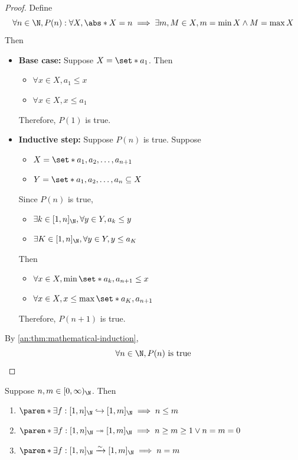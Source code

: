 \begin{proof}
  Define
  \[
    \forall n \in \N, P(n): \forall X, \abs*{X} = n \implies \exists m, M \in X, m = \min X \land M = \max X
  \]
  Then
  \begin{itemize}
    \item \textbf{Base case:} Suppose $X = \set*{a_{1}}$. Then
          \begin{itemize}
            \item $\forall x \in X, a_{1} \leq x$
            \item $\forall x \in X, x \leq a_{1}$
          \end{itemize}
          Therefore, $P(1)$ is true.
    \item \textbf{Inductive step:} Suppose $P(n)$ is true. Suppose
          \begin{itemize}
            \item $X = \set*{a_{1}, a_{2}, \dots, a_{n + 1}}$
            \item $Y = \set*{a_{1}, a_{2}, \dots, a_{n}} \subseteq X$
          \end{itemize}
          Since $P(n)$ is true,
          \begin{itemize}
            \item $\exists k \in [1, n]_{\N}, \forall y \in Y, a_{k} \leq y$
            \item $\exists K \in [1, n]_{\N}, \forall y \in Y, y \leq a_{K}$
          \end{itemize}
          Then
          \begin{itemize}
            \item $\forall x \in X, \min\set*{{a_{k}, a_{n + 1}}} \leq x$
            \item $\forall x \in X, x \leq \max\set*{{a_{K}, a_{n + 1}}}$
          \end{itemize}
          Therefore, $P(n + 1)$ is true.
  \end{itemize}
  By \cref{an:thm:mathematical-induction},
  \[
    \forall n \in \N, P(n) \text{ is true}
  \]
\end{proof}

\bigskip

\begin{lemma} \label{an:lem:properties-of-Nm-Nn}
  Suppose $n, m \in [0, \infty)_{\N}$. Then
  \begin{enumerate}[label=\textbf{(\Alph*)}]
    \item $\paren*{\exists f: [1, n]_{\N} \hookrightarrow [1, m]_{\N}} \implies n \leq m$
    \item $\paren*{\exists f: [1, n]_{\N} \twoheadrightarrow [1, m]_{\N}} \implies n \geq m \geq 1 \lor n = m = 0$
    \item $\paren*{\exists f: [1, n]_{\N} \xrightarrow{\sim} [1, m]_{\N}} \implies n = m$
  \end{enumerate}
\end{lemma}
